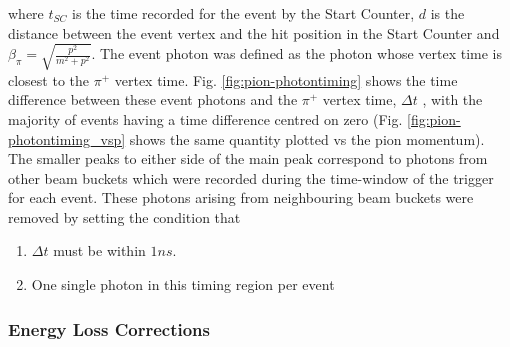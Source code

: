 where $t_{SC}$ is the time recorded for the event by the Start Counter, $d$ is the distance between the event vertex and the hit position in the Start Counter  and $\beta_\pi = \sqrt{\frac{p^2}{m^2 + p^2}} $.  The event photon was defined as the photon whose vertex time is closest to the $\pi^+$ vertex time. Fig. \ref{fig:pion-photontiming} shows the time difference between these event photons and the $\pi^+$ vertex time, $\Delta t$ , with the majority of events having a time difference centred on zero (Fig. \ref{fig:pion-photontiming_vsp} shows the same quantity plotted vs the pion momentum). The smaller peaks to either side of the main peak correspond to photons from other beam buckets which were recorded during the time-window of the trigger for each event. These photons arising from neighbouring beam buckets were removed by setting the condition that 
\begin{enumerate}
\item $\Delta t$ must be within $1 ns$. 
\item One single photon in this timing region per event
\end{enumerate}


\subsubsection{Energy Loss Corrections}

